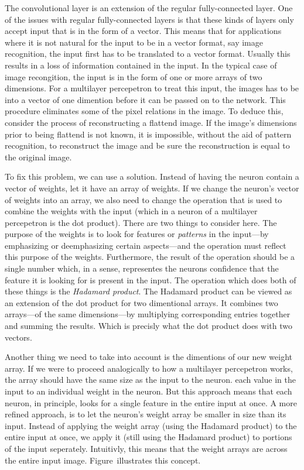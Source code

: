 The convolutional layer is an extension of the regular fully-connected layer.
One of the issues with regular fully-connected layers is that these kinds of layers only accept input that is in the form of a vector.
This means that for applications where it is not natural for the input to be in a vector format, say image recognition, the input first has to be translated to a vector format.
Usually this results in a loss of information contained in the input.
In the typical case of image recongition, the input is in the form of one or more arrays of two dimensions.
For a multilayer percepetron to treat this input, the images has to be  into a vector of one dimention before it can be passed on to the network.
This procedure eliminates some of the pixel relations in the image.
To deduce this, consider the process of reconstructing a flattend image.
If the image's dimensions prior to being flattend is not known, it is impossible, without the aid of pattern recognition, to reconstruct the image and be sure the reconstruction is equal to the original image.

To fix this problem, we can use a  solution.
Instead of having the neuron contain a vector of weights, let it have an array of weights.
If we change the neuron's vector of weights into an array, we also need to change the operation that is used to combine the weights with the input (which in a neuron of a multilayer percepetron is the dot product).
There are two things to consider here.
The purpose of the weights is to look for features or {\em patterns} in the input---by emphasizing or deemphasizing certain aspects---and the operation must reflect this purpose of the weights.
Furthermore, the result of the operation should be a single number which, in a sense, representes the neurons  confidence that the feature it is looking for is present in the input.
The operation which does both of these things is the {\em Hadamard product}.
The Hadamard product can be viewed as an extension of the dot product for two dimentional arrays.
It combines two arrays---of the same dimensions---by multiplying corresponding entries together and summing the results.
Which is precisly what the dot product does with two vectors.

Another thing we need to take into account is the dimentions of our new weight array.
If we were to proceed analogically to how a multilayer percepetron works, the array should have the same size as the input to the neuron.
 each value in the input to an individual weight in the neuron.
But this approach means that each neuron, in principle, looks for a single feature in the entire input at once.
A more refined approach, is to let the neuron's weight array be smaller in size than its input.
Instead of applying the weight array (using the Hadamard product) to the entire input at once, we apply it (still using the Hadamard product) to portions of the input seperately.
Intuitivly, this means that the weight arrays are  across the entire input image.
Figure~ illustrates this concept.

